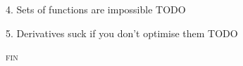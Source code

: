 \documentclass[dvipsnames]{beamer}
\newcommand\x\times
\newcommand{\ms}{\mathsf}
\newcommand{\setfor}[2]{\{#1 ~|~ #2\}}
\newcommand\kw[1]{\ensuremath{\mathbf{#1}}}
\newcommand\fname[1]{\ensuremath{\mathrm{#1}}}
\newcommand\aname[1]{\ensuremath{\mathit{#1}}}
\begin{document}
\begin{frame}{4. Sets of functions are impossible}
  \huge\centering
  {\color{red} TODO}
\end{frame}

\begin{frame}{5. Derivatives suck if you don't optimise them}
  \huge\centering
  {\color{red} TODO}
\end{frame}


\begin{frame}
  \centering \huge \scshape fin
\end{frame}



\end{document}
